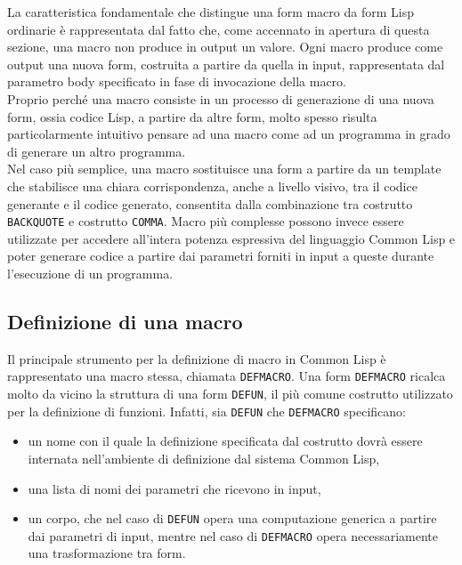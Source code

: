 La caratteristica fondamentale che distingue una form macro da form Lisp
ordinarie è rappresentata dal fatto che, come accennato in apertura di questa
sezione, una macro non produce in output un valore. Ogni macro produce come
output una nuova form, costruita a partire da quella in input, rappresentata dal
parametro body specificato in fase di invocazione della macro.\\

Proprio perché una macro consiste in un processo di generazione di una nuova
form, ossia codice Lisp, a partire da altre form, molto spesso risulta
particolarmente intuitivo pensare ad una macro come ad un programma in grado di
generare un altro programma.\\

Nel caso più semplice, una macro sostituisce una form a partire da un template
che stabilisce una chiara corrispondenza, anche a livello visivo, tra il codice
generante e il codice generato, consentita dalla combinazione tra costrutto
\texttt{BACKQUOTE} e costrutto \texttt{COMMA}. Macro più complesse possono
invece essere utilizzate per accedere all’intera potenza espressiva del
linguaggio Common Lisp e poter generare codice a partire dai parametri forniti
in input a queste durante l’esecuzione di un programma.

\subsection{Definizione di una macro}

Il principale strumento per la definizione di macro in Common Lisp è
rappresentato una macro stessa, chiamata \texttt{DEFMACRO}. Una form
\texttt{DEFMACRO} ricalca molto da vicino la struttura di una form
\texttt{DEFUN}, il più comune costrutto utilizzato per la definizione di
funzioni. Infatti, sia \texttt{DEFUN} che \texttt{DEFMACRO} specificano:

\begin{itemize}

\item un nome con il quale la definizione specificata dal costrutto dovrà essere
internata nell'ambiente di definizione dal sistema Common Lisp,

\item una lista di nomi dei parametri che ricevono in input,

\item un corpo, che nel caso di \texttt{DEFUN} opera una computazione generica a
partire dai parametri di input, mentre nel caso di \texttt{DEFMACRO} opera
necessariamente una trasformazione tra form.

\end{itemize}


